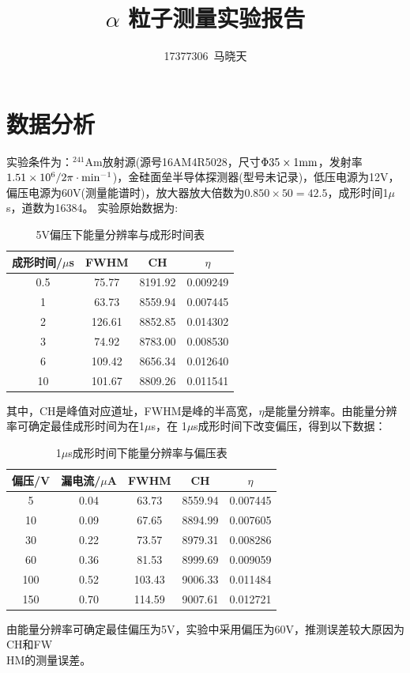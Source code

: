 \documentclass[UTF8]{ctexart}
\title{$ \alpha $ 粒子测量实验报告}
\author{17377306\ 马晓天}
\begin{document}
\maketitle

\thispagestyle{empty}
\section{数据分析}
实验条件为：$^{241}$Am放射源(源号16AM4R5028，尺寸$ \Phi35\times1\rm mm $，发射率$\rm 1.51\times10^{6}/2\pi\cdot min^{-1} $)，金硅面垒半导体探测器(型号未记录)，低压电源为12V，偏压电源为60V(测量能谱时)，放大器放大倍数为$ 0.850\times50=42.5 $，成形时间1$ \mu $s，道数为16384。
实验原始数据为:
\begin{table}[H]
	\centering
	\caption{5V偏压下能量分辨率与成形时间表}
	\begin{tabular}{cccc}
		\hline
		成形时间/$ \mu $s & FWHM & CH & $ \eta $ \\
		\hline
		0.5&75.77&8191.92&0.009249\\
		1&63.73&8559.94&0.007445\\
		2&126.61&8852.85&0.014302\\
		3&74.92&8783.00&0.008530\\
		6&109.42&8656.34&0.012640\\
		10&101.67&8809.26&0.011541\\
		\hline
	\end{tabular}
\end{table}
其中，CH是峰值对应道址，FWHM是峰的半高宽，$ \eta $是能量分辨率。由能量分辨率可确定最佳成形时间为在1$ \mu $s，在 1$ \mu $s成形时间下改变偏压，得到以下数据：
\begin{table}[H]
	\centering
	\caption{1$ \mu $s成形时间下能量分辨率与偏压表}
	\begin{tabular}{ccccc}
		\hline
		偏压/V & 漏电流/$ \mu $A & FWHM & CH & $ \eta $ \\
		\hline
		5&0.04&63.73&8559.94&0.007445\\
		10&0.09&67.65&8894.99&0.007605\\
		30&0.22&73.57&8979.31&0.008286\\
		60&0.36&81.53&8999.69&0.009059\\
		100&0.52&103.43&9006.33&0.011484\\
		150&0.70&114.59&9007.61&0.012721\\
		\hline
	\end{tabular}
\end{table}
由能量分辨率可确定最佳偏压为5V，实验中采用偏压为60V，推测误差较大原因为CH和FW\\HM的测量误差。
\end{document}
